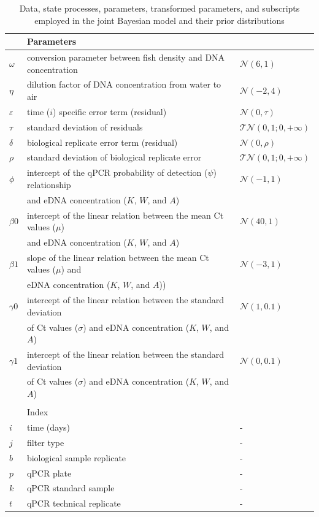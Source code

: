 \documentclass{article}
\begin{document}
\begin{table}
\begin{tabular}{lll}
&Parameters&\\
\hline
$\omega$& conversion parameter between fish density
and DNA concentration & $\mathcal{N}(6,1)$\\
$\eta$& dilution factor of DNA concentration
from water to air & $\mathcal{N}(-2,4)$\\
$\varepsilon$& time ($i$) specific error term (residual) & $\mathcal{N}(0,\tau)$\\
$\tau$& standard deviation of residuals & $\mathcal{TN}(0,1;0, +\infty)$\\
$\delta$& biological replicate error term (residual) & $\mathcal{N}(0,\rho)$\\
$\rho$& standard deviation of biological replicate error & $\mathcal{TN}(0,1;0, +\infty)$\\
$\phi$& intercept of the qPCR probability of detection ($\psi$) relationship &$\mathcal{N}(-1,1)$\\
& and eDNA concentration ($K$, $W$, and $A$) \\
$\beta0$& intercept of the linear relation between the mean Ct values ($\mu$)&$\mathcal{N}(40,1)$\\
&and eDNA concentration ($K$, $W$, and $A$) & \\
$\beta1$& slope of the linear relation between the mean Ct values ($\mu$) and &$\mathcal{N}(-3,1)$\\
&eDNA concentration ($K$, $W$, and $A$)) & \\
$\gamma0$& intercept of the linear relation between the standard deviation&$\mathcal{N}(1,0.1)$\\
&of Ct values ($\sigma$) and eDNA concentration ($K$, $W$, and $A$) & \\
$\gamma1$& intercept of the linear relation between the standard deviation &$\mathcal{N}(0,0.1)$\\
&of Ct values ($\sigma$) and eDNA concentration ($K$, $W$, and $A$) & \\
&&\\
&Index&\\
\hline
$i$& time (days) & -\\
$j$& filter type & -\\
$b$& biological sample replicate & -\\
$p$& qPCR plate & -\\
$k$& qPCR standard sample & -\\
$t$& qPCR technical replicate & -\\


    \end{tabular}
    \caption{Data, state processes, parameters, transformed parameters, and subscripts employed in the joint Bayesian model and their prior distributions}
    \label{tab:priortable}
\end{table}
\end{document}
